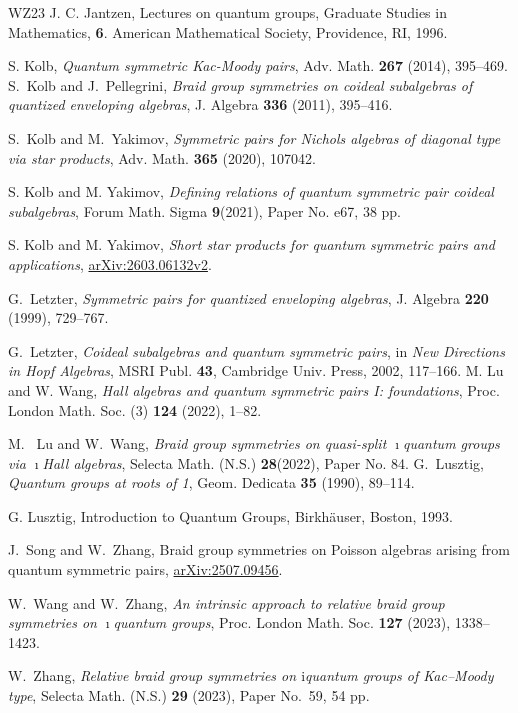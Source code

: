 \documentclass[a4paper,reqno,12pt]{amsart}
\numberwithin{equation}{section}
\theoremstyle{definition}
\theoremstyle{plain}
\theoremstyle{definition}
\begin{document}
\begin{thebibliography}{WZ23}
 J. C. Jantzen, Lectures on quantum groups, Graduate Studies in Mathematics, {\bf6}. American Mathematical Society, Providence, RI, 1996.


 S. Kolb,
{\em Quantum symmetric Kac-Moody pairs}, Adv. Math. {\bf 267} (2014), 395--469.
S.~Kolb and J.~Pellegrini,
\emph{Braid group symmetries on coideal subalgebras of quantized enveloping algebras},
J. Algebra \textbf{336} (2011), 395--416.

 S.~Kolb and M.~Yakimov, \emph{Symmetric pairs for Nichols algebras of diagonal type via star products}, Adv. Math. \textbf{365} (2020), 107042.





 S. Kolb and M. Yakimov, {\em Defining relations of quantum symmetric pair coideal subalgebras}, Forum Math. Sigma {\bf 9}(2021), Paper No. e67, 38 pp.

 S. Kolb and M. Yakimov, {\em Short star products for quantum symmetric pairs and applications}, \href{https://arxiv.org/abs/2603.06132v2}{arXiv:2603.06132v2}.

 G.~Letzter, \emph{Symmetric pairs for quantized enveloping algebras}, J. Algebra \textbf{220} (1999), 729--767.

G.~Letzter, \emph{Coideal subalgebras and quantum symmetric pairs},
in \emph{New Directions in Hopf Algebras}, MSRI Publ. \textbf{43},
Cambridge Univ. Press, 2002, 117--166.
 M. Lu and W. Wang, {\em Hall algebras and quantum symmetric pairs I: foundations},  Proc. London Math. Soc. (3) {\bf124} (2022), 1--82.

 M.~ Lu and W.~Wang,
{\em Braid group symmetries on quasi-split $\imath$quantum groups via $\imath$Hall algebras}, Selecta Math. (N.S.) {\bf 28}(2022), Paper No. 84.
 G.~Lusztig, \emph{Quantum groups at roots of 1}, Geom. Dedicata \textbf{35} (1990), 89--114.

 G. Lusztig, Introduction to Quantum Groups, Birkh\"{a}user, Boston, 1993.


 J.~Song and W.~Zhang, {Braid group symmetries on Poisson algebras arising from quantum symmetric pairs}, \href{https://arxiv.org/abs/2507.09456}{arXiv:2507.09456}.

W.~Wang and W.~Zhang,
\emph{An intrinsic approach to relative braid group symmetries on
$\imath$quantum groups}, Proc. London Math. Soc. \textbf{127} (2023), 1338--1423.

W.~Zhang, \emph{Relative braid group symmetries on $\mathrm i$quantum groups of Kac--Moody type}, Selecta Math. (N.S.) \textbf{29} (2023), Paper No.~59, 54 pp.

\end{thebibliography}
\end{document}
